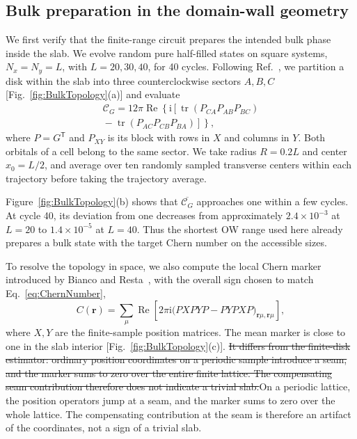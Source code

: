 \documentclass[aps,prb,10pt,twocolumn,superscriptaddress,longbibliography,floatfix]{revtex4-2}
\newcommand{\ii}{\mathrm{i}}
\newcommand{\mc}[1]{\mathcal{#1}}
\newcommand{\bfr}{\boldsymbol r}
\newcommand{\claudeadd}[1]{{\color{orange}#1}}
\newcommand{\claudedel}[1]{{\color{orange}\sout{#1}}}
\begin{document}
{\color{blue}
\subsection{Bulk preparation in the domain-wall geometry}
\label{sec:BulkTopology}

We first verify that the finite-range circuit prepares the intended bulk phase inside the slab. We evolve random pure half-filled states on square systems, $N_x=N_y=L$, with $L=20,30,40$, for 40 cycles. Following Ref.~\cite{Kitaev2006}, we partition a disk within the slab into three counterclockwise sectors $A,B,C$ [Fig.~\ref{fig:BulkTopology}(a)] and evaluate
\begin{align}
    \mc C_G=12\pi\operatorname{Re}\!\left\{\ii\left[\operatorname{tr}(P_{CA}P_{AB}P_{BC})\right.\right.\nonumber\\
    \left.\left.{}-\operatorname{tr}(P_{AC}P_{CB}P_{BA})\right]\right\},
    \label{eq:KitaevChern}
\end{align}
where $P=G^{\mathsf T}$ and $P_{XY}$ is its block with rows in $X$ and columns in $Y$. Both orbitals of a cell belong to the same sector. We take radius $R=0.2L$ and center $x_0=L/2$, and average over ten randomly sampled transverse centers within each trajectory before taking the trajectory average.

Figure~\ref{fig:BulkTopology}(b) shows that $\overline{\mc C_G}$ approaches one within a few cycles. At cycle 40, its deviation from one decreases from approximately $2.4\times10^{-3}$ at $L=20$ to $1.4\times10^{-5}$ at $L=40$. Thus the shortest OW range used here already prepares a bulk state with the target Chern number on the accessible sizes.

To resolve the topology in space, we also compute the local Chern marker introduced by Bianco and Resta~\cite{BiancoResta2011}, with the overall sign chosen to match Eq.~\eqref{eq:ChernNumber},
\begin{equation}
 C(\bfr)=\sum_\mu\operatorname{Re}\!\left[2\pi\ii\big(PXPYP-PYPXP\big)_{\bfr\mu,\bfr\mu}\right],
 \label{eq:LocalMarker}
\end{equation}
where $X,Y$ are the finite-sample position matrices. The mean marker is close to one in the slab interior [Fig.~\ref{fig:BulkTopology}(c)]. \claudedel{It differs from the finite-disk estimator: ordinary position coordinates on a periodic sample introduce a seam, and the marker sums to zero over the entire finite lattice. The compensating seam contribution therefore does not indicate a trivial slab.}\claudeadd{On a periodic lattice, the position operators jump at a seam, and the marker sums to zero over the whole lattice. The compensating contribution at the seam is therefore an artifact of the coordinates, not a sign of a trivial slab.}
}
\end{document}
